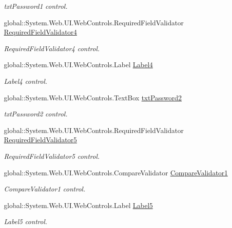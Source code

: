 \begin{DoxyCompactItemize}
\begin{DoxyCompactList}\small\item\em txt\+Password1 control. \end{DoxyCompactList}\item 
global\+::\+System.\+Web.\+U\+I.\+Web\+Controls.\+Required\+Field\+Validator \mbox{\hyperlink{classwebprueba_1_1_registro_ae120f3a2f6af2cc1b45c4f74b401880f}{Required\+Field\+Validator4}}
\begin{DoxyCompactList}\small\item\em Required\+Field\+Validator4 control. \end{DoxyCompactList}\item 
global\+::\+System.\+Web.\+U\+I.\+Web\+Controls.\+Label \mbox{\hyperlink{classwebprueba_1_1_registro_a09f3a5f7b4c2a6e6df111f4b86118c68}{Label4}}
\begin{DoxyCompactList}\small\item\em Label4 control. \end{DoxyCompactList}\item 
global\+::\+System.\+Web.\+U\+I.\+Web\+Controls.\+Text\+Box \mbox{\hyperlink{classwebprueba_1_1_registro_ad3b118ef8bbc387dc636f498bce77af4}{txt\+Password2}}
\begin{DoxyCompactList}\small\item\em txt\+Password2 control. \end{DoxyCompactList}\item 
global\+::\+System.\+Web.\+U\+I.\+Web\+Controls.\+Required\+Field\+Validator \mbox{\hyperlink{classwebprueba_1_1_registro_a3d2be0ece74dedad7ab74b7212b7fa3b}{Required\+Field\+Validator5}}
\begin{DoxyCompactList}\small\item\em Required\+Field\+Validator5 control. \end{DoxyCompactList}\item 
global\+::\+System.\+Web.\+U\+I.\+Web\+Controls.\+Compare\+Validator \mbox{\hyperlink{classwebprueba_1_1_registro_a768895011ffad1b0697ab853401c9bc3}{Compare\+Validator1}}
\begin{DoxyCompactList}\small\item\em Compare\+Validator1 control. \end{DoxyCompactList}\item 
global\+::\+System.\+Web.\+U\+I.\+Web\+Controls.\+Label \mbox{\hyperlink{classwebprueba_1_1_registro_a7ddf3c33c56714110d105285b718f4df}{Label5}}
\begin{DoxyCompactList}\small\item\em Label5 control. \end{DoxyCompactList}\item 

\end{DoxyCompactItemize}
